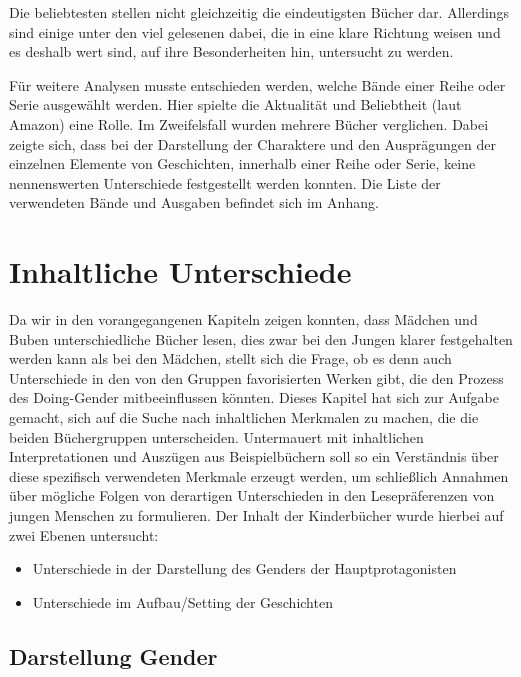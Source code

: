 Die beliebtesten stellen nicht gleichzeitig die eindeutigsten Bücher
dar. Allerdings sind einige unter den viel gelesenen dabei, die in eine
klare Richtung weisen und es deshalb wert sind, auf ihre Besonderheiten
hin, untersucht zu werden.

Für weitere Analysen musste entschieden werden, welche Bände einer Reihe
oder Serie ausgewählt werden. Hier spielte die Aktualität und
Beliebtheit (laut Amazon) eine Rolle. Im Zweifelsfall wurden mehrere
Bücher verglichen. Dabei zeigte sich, dass bei der Darstellung der
Charaktere und den Ausprägungen der einzelnen Elemente von Geschichten,
innerhalb einer Reihe oder Serie, keine nennenswerten Unterschiede
festgestellt werden konnten. Die Liste der verwendeten Bände und
Ausgaben befindet sich im Anhang.

\chapter{Inhaltliche Unterschiede}

Da wir in den vorangegangenen Kapiteln zeigen konnten, dass Mädchen und
Buben unterschiedliche Bücher lesen, dies zwar bei den Jungen klarer
festgehalten werden kann als bei den Mädchen, stellt sich die Frage, ob
es denn auch Unterschiede in den von den Gruppen favorisierten Werken
gibt, die den Prozess des Doing-Gender mitbeeinflussen könnten. Dieses
Kapitel hat sich zur Aufgabe gemacht, sich auf die Suche nach
inhaltlichen Merkmalen zu machen, die die beiden Büchergruppen
unterscheiden. Untermauert mit inhaltlichen Interpretationen und
Auszügen aus Beispielbüchern soll so ein Verständnis über diese
spezifisch verwendeten Merkmale erzeugt werden, um schließlich Annahmen
über mögliche Folgen von derartigen Unterschieden in den Lesepräferenzen
von jungen Menschen zu formulieren. Der Inhalt der Kinderbücher wurde
hierbei auf zwei Ebenen untersucht:

\begin{itemize}
\item
  Unterschiede in der Darstellung des Genders der Hauptprotagonisten
\item
  Unterschiede im Aufbau/Setting der Geschichten
\end{itemize}

\section{Darstellung Gender}

